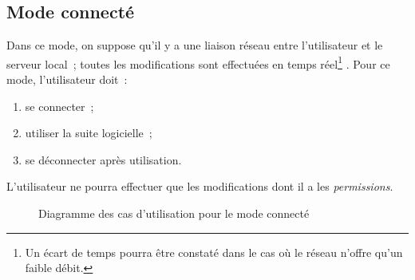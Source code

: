 \subsection{Mode connecté}
Dans ce mode, on suppose qu'il y a une liaison réseau entre l'utilisateur et le serveur local~; toutes les modifications sont effectuées en \og temps réel\footnote{Un écart de temps pourra être constaté dans le cas où le réseau n'offre qu'un faible débit.} \fg{}.
Pour ce mode, l'utilisateur doit~:
\begin{enumerate}
    \item se connecter~;
    \item utiliser la suite logicielle~;
    \item se déconnecter après utilisation.
\end{enumerate}
L'utilisateur ne pourra effectuer que les modifications dont il a les \emph{permissions}.
\begin{figure}[htbp]
    \centering
	\caption{Diagramme des cas d'utilisation pour le mode connecté}
	\label{ucmodeco}
\end{figure}

